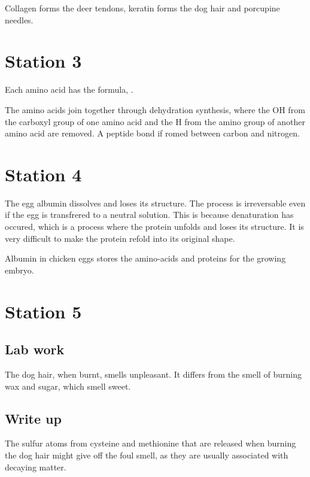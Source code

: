 \documentclass[12pt]{article}
\begin{document}
Collagen forms the deer tendons, keratin forms the dog hair 
and porcupine needles. 

\section*{Station 3}
Each amino acid has the formula, .

The amino acids join together through dehydration synthesis, 
where the OH from the carboxyl group of one amino acid 
and the H from the amino group of another amino acid are removed.
A peptide bond if romed between carbon and nitrogen. 

\section*{Station 4}
The egg albumin dissolves and loses its structure. The process is irreversable 
even if the egg is transfrered to a neutral solution. 
This is because denaturation has occured, which is a process where the protein
unfolds and loses its structure. It is very difficult to 
make the protein refold into its original shape. 

Albumin in chicken eggs stores the amino-acids and proteins for the 
growing embryo. 

\section*{Station 5}
\subsection*{Lab work}
The dog hair, when burnt, smells unpleasant. It differs from the
smell of burning wax and sugar, which smell sweet.

\subsection*{Write up}
The sulfur atoms from cysteine and methionine that 
are released when burning the dog hair might give off the foul smell, as
they are usually associated with decaying matter.
\end{document}
